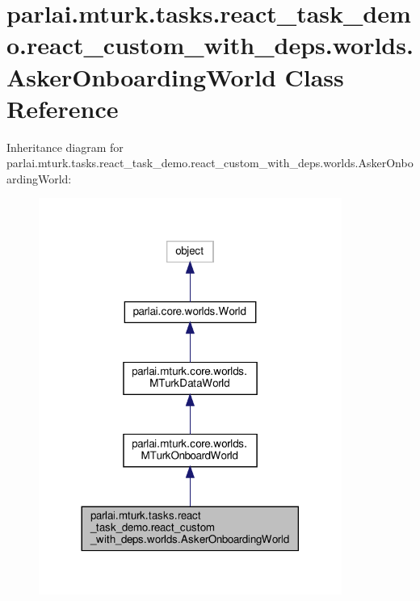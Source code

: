\hypertarget{classparlai_1_1mturk_1_1tasks_1_1react__task__demo_1_1react__custom__with__deps_1_1worlds_1_1AskerOnboardingWorld}{}\section{parlai.\+mturk.\+tasks.\+react\+\_\+task\+\_\+demo.\+react\+\_\+custom\+\_\+with\+\_\+deps.\+worlds.\+Asker\+Onboarding\+World Class Reference}
\label{classparlai_1_1mturk_1_1tasks_1_1react__task__demo_1_1react__custom__with__deps_1_1worlds_1_1AskerOnboardingWorld}


Inheritance diagram for parlai.\+mturk.\+tasks.\+react\+\_\+task\+\_\+demo.\+react\+\_\+custom\+\_\+with\+\_\+deps.\+worlds.\+Asker\+Onboarding\+World\+:
\nopagebreak
\begin{figure}[H]
\begin{center}
\leavevmode
\includegraphics[width=281pt]{classparlai_1_1mturk_1_1tasks_1_1react__task__demo_1_1react__custom__with__deps_1_1worlds_1_1Ask39a75c41edc078285f71c6d91ac08c57}
\end{center}
\end{figure}


